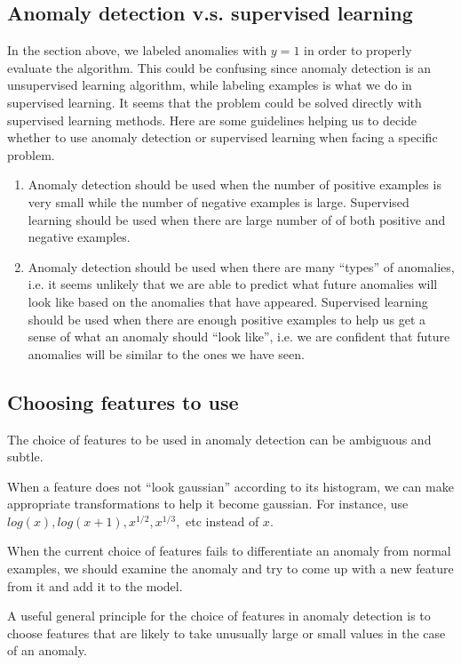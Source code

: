 \subsection{Anomaly detection v.s. supervised learning}
In the section above, we labeled anomalies with $y=1$ in order to properly evaluate the algorithm. This could be confusing since anomaly detection is an unsupervised learning algorithm, while labeling examples is what we do in supervised learning. It seems that the problem could be solved directly with supervised learning methods. Here are some guidelines helping us to decide whether to use anomaly detection or supervised learning when facing a specific problem.
\begin{enumerate}
\item Anomaly detection should be used when the number of positive examples is very small while the number of negative examples is large. Supervised learning should be used when there are large number of of both positive and negative examples.
\item Anomaly detection should be used when there are many ``types'' of anomalies, i.e. it seems unlikely that we are able to predict what future anomalies will look like based on the anomalies that have appeared. Supervised learning should be used when there are enough positive examples to help us get a sense of what an anomaly should ``look like'', i.e. we are confident that future anomalies will be similar to the ones we have seen.
\end{enumerate}
\subsection{Choosing features to use}
The choice of features to be used in anomaly detection can be ambiguous and subtle.

When a feature does not ``look gaussian'' according to its histogram, we can make appropriate transformations to help it become gaussian. For instance, use $log(x), log(x+1), x^{1/2}, x^{1/3},$ etc instead of $x$.

When the current choice of features fails to differentiate an anomaly from normal examples, we should examine the anomaly and try to come up with a new feature from it and add it to the model.

A useful general principle for the choice of features in anomaly detection is to choose features that are likely to take unusually large or small values in the case of an anomaly.
